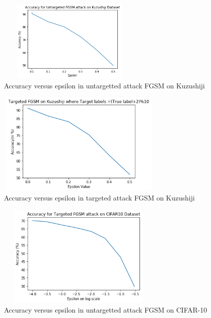 \documentclass[11pt]{article}
\begin{document}
\begin{center}
        \begin{figure}[!h]
        \centering
          \includegraphics[width=70mm, height=40mm]{kuzu_untargeted_FGSM_accuracy.png}
          \caption{ Accuracy versus epsilon in untargetted attack FGSM on Kuzushiji
          }
          \label{fig:Piston}
        \end{figure}
\end{center}

\begin{center}
        \begin{figure}[!h]
        \centering
          \includegraphics[width=80mm, height=50mm]{kuzushiji_targetedfgsm.png}
          \caption{ Accuracy versus epsilon in targeted attack FGSM on Kuzushiji
          }
          \label{fig:Piston}
        \end{figure}
\end{center}


\begin{center}
        \begin{figure}[h]
        \centering
          \includegraphics[width=80mm, height=50mm]{cifar targeted fgsm accuracy.png}
          \caption{ Accuracy versus epsilon in untargetted attack FGSM on CIFAR-10
          }
          \label{fig:Piston}
        \end{figure}
\end{center}
\end{document}
